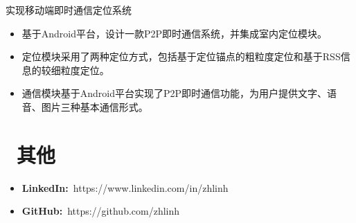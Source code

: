 \documentclass{resume}
\begin{document}
\setlength{\parindent}{2em}实现移动端即时通信定位系统
\begin{onehalfspacing}
\begin{itemize}[leftmargin=5em]
  \item 基于Android平台，设计一款P2P即时通信系统，并集成室内定位模块。
  \item 定位模块采用了两种定位方式，包括基于定位锚点的粗粒度定位和基于RSS信息的较细粒度定位。
  \item 通信模块基于Android平台实现了P2P即时通信功能，为用户提供文字、语音、图片三种基本通信形式。
\end{itemize}
\end{onehalfspacing}


\section{\faEnvelopeO\ 其他}
\begin{itemize}[parsep=0.5ex]
  \item \textbf{LinkedIn:}\ https://www.linkedin.com/in/zhlinh
  \item \textbf{GitHub:}\ https://github.com/zhlinh
\end{itemize}

%
%
\end{document}
